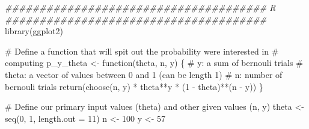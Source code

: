 \documentclass[
  letterpaper,
  DIV=11,
  numbers=noendperiod]{scrartcl}
\newenvironment{Shaded}{\begin{snugshade}}{\end{snugshade}}
\newcommand{\AttributeTok}[1]{\textcolor[rgb]{0.40,0.45,0.13}{#1}}
\newcommand{\CommentTok}[1]{\textcolor[rgb]{0.37,0.37,0.37}{#1}}
\newcommand{\ControlFlowTok}[1]{\textcolor[rgb]{0.00,0.23,0.31}{#1}}
\newcommand{\DecValTok}[1]{\textcolor[rgb]{0.68,0.00,0.00}{#1}}
\newcommand{\DocumentationTok}[1]{\textcolor[rgb]{0.37,0.37,0.37}{\textit{#1}}}
\newcommand{\FunctionTok}[1]{\textcolor[rgb]{0.28,0.35,0.67}{#1}}
\newcommand{\NormalTok}[1]{\textcolor[rgb]{0.00,0.23,0.31}{#1}}
\newcommand{\OtherTok}[1]{\textcolor[rgb]{0.00,0.23,0.31}{#1}}
\newcommand{\SpecialCharTok}[1]{\textcolor[rgb]{0.37,0.37,0.37}{#1}}
\begin{document}
\begin{Shaded}
\begin{Highlighting}[]
\DocumentationTok{\#\#\#\#\#\#\#\#\#\#\#\#\#\#\#\#\#\#\#\#\#\#\#\#\#\#\#\#\#\#\#\#\#\#\#\#\#\# R \#\#\#\#\#\#\#\#\#\#\#\#\#\#\#\#\#\#\#\#\#\#\#\#\#\#\#\#\#\#\#\#\#\#\#\#\#\#}
\FunctionTok{library}\NormalTok{(ggplot2)}

\CommentTok{\# Define a function that will spit out the probability we\textquotesingle{}re interested in}
\CommentTok{\# computing}
\NormalTok{p\_y\_theta }\OtherTok{\textless{}{-}} \ControlFlowTok{function}\NormalTok{(theta, n, y) \{}
    \CommentTok{\# y: a sum of bernouli trials}
    \CommentTok{\# theta: a vector of values between 0 and 1 (can be length 1)}
    \CommentTok{\# n: number of bernouli trials}
    \FunctionTok{return}\NormalTok{(}\FunctionTok{choose}\NormalTok{(n, y) }\SpecialCharTok{*}\NormalTok{ theta}\SpecialCharTok{**}\NormalTok{y }\SpecialCharTok{*}\NormalTok{ (}\DecValTok{1} \SpecialCharTok{{-}}\NormalTok{ theta)}\SpecialCharTok{**}\NormalTok{(n }\SpecialCharTok{{-}}\NormalTok{ y))}
\NormalTok{\}}

\CommentTok{\# Define our primary input values (theta) and other given values (n, y)}
\NormalTok{theta }\OtherTok{\textless{}{-}} \FunctionTok{seq}\NormalTok{(}\DecValTok{0}\NormalTok{, }\DecValTok{1}\NormalTok{, }\AttributeTok{length.out =} \DecValTok{11}\NormalTok{)}
\NormalTok{n }\OtherTok{\textless{}{-}} \DecValTok{100}
\NormalTok{y }\OtherTok{\textless{}{-}} \DecValTok{57}


\end{Highlighting}
\end{Shaded}
\end{document}
